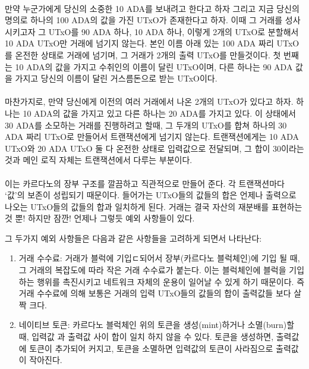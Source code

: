 \documentclass[a4paper, 11pt]{article}
\begin{document}
    \paragraph{} 만약 누군가에게 당신의 소중한 10 ADA를 보내려고 한다고 하자 그리고 지금 당신의 명의로 하나의 100 ADA의 값을 가진 UTxO가 존재한다고 하자. 이때 그 거래를 성사시키고자 그 UTxO를 90 ADA 하나, 10 ADA 하나, 이렇게 2개의 UTxO로 분할해서 10 ADA UTxO만 거래에 넘기지 않는다. 본인 이름 아래 있는 100 ADA 짜리 UTxO를 온전한 상태로 거래에 넘기며, 그 거래가 2개의 출력 UTxO를 만들것이다. 첫 번째는 10 ADA의 값을 가지고 수취인의 이름이 달린 UTxO이며, 다른 하나는 90 ADA 값을 가지고 당신의 이름이 달린 거스름돈으로 받는 UTxO이다.

    \paragraph{} 마찬가지로, 만약 당신에게 이전의 여러 거래에서 나온 2개의 UTxO가 있다고 하자. 하나는 10 ADA의 값을 가지고 있고 다른 하나는 20 ADA를 가지고 있다. 이 상태에서 30 ADA를 소모하는 거래를 진행하려고 할때, 그 두개의 UTxO를 합쳐 하나의 30 ADA 짜리 UTxO로 만들어서 트랜잭션에게 넘기지 않는다. 트랜잭션에게는 10 ADA UTxO와 20 ADA UTxO 둘 다 온전한 상태로 입력값으로 전달되며, 그 합이 30이라는 것과 메인 로직 자체는 트랜잭션에서 다루는 부분이다.

    \paragraph{} 이는 카르다노의 장부 구조를 깔끔하고 직관적으로 만들어 준다. 각 트랜잭션마다 `값'의 보존이 성립되기 때문이다. 들어가는 UTxO들의 값들의 합은 언제나 출력으로 나오는 UTxO들의 값들의 합과 일치하게 된다. 거래는 결국 자산의 재분배를 표현하는 것 뿐! 하지만 잠깐! 언제나 그렇듯 예외 사항들이 있다.

    그 두가지 예외 사항들은 다음과 같은 사항들을 고려하게 되면서 나타난다:
    \begin{enumerate}
        \item 거래 수수료: 거래가 블럭에 기입ㄷ되어서 장부(카르다노 블럭체인)에 기입 될 때, 그 거래의 복잡도에 따라 작은 거래 수수료가 붙는다. 이는 블럭체인에 블럭을 기입하는 행위를 촉진시키고 네트워크 자체의 운용이 일어날 수 있게 하기 때문이다. 즉 거래 수수료에 의해 보통은 거래의 입력 UTxO들의 값들의 합이 출력값들 보다 살짝 크다.
        \item 네이티브 토큰: 카르다노 블럭체인 위의 토큰을 생성(mint)하거나 소멸(burn)할 때, 입력값 과 출력값 사이 합이 일치 하지 않을 수 있다. 토큰을 생성하면, 출력값에 토큰이 추가되어 커지고, 토큰을 소멸하면 입력값의 토큰이 사라짐으로 출력값이 작아진다.
    \end{enumerate}
\end{document}
